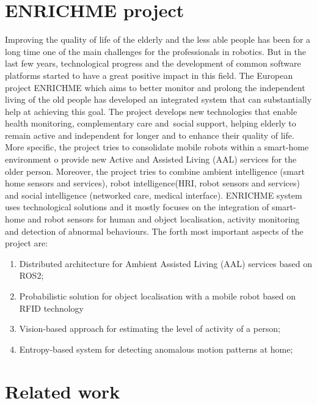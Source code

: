 \section{ENRICHME project}
Improving the quality of life of the elderly and the less able people has been for a long time one of the main challenges for
the professionals in robotics. But in the last few years, technological progress and the development of common software platforms
started to have a great positive impact in this field. The European project ENRICHME which aims to better monitor and prolong the
independent living of the old people has developed an integrated system that can substantially help at achieving this goal. 
The project develops new technologies that enable health monitoring, complementary care and social support, helping elderly to
remain active and independent for longer and to enhance their quality of life. More specific, the project tries to consolidate
mobile robots within a smart-home environment o provide new Active and Assisted Living (AAL) services for the older person.
Moreover, the project tries to combine ambient intelligence (smart home sensors and services), robot intelligence(HRI, robot sensors and services)
and social intelligence (networked care, medical interface). ENRICHME system uses technological solutions and it mostly focuses on the integration
of smart-home and robot sensors for human and object localisation, activity monitoring and detection of abnormal behaviours. The forth most important
aspects of the project are:
\begin{enumerate}
	\item Distributed architecture for Ambient Assisted Living (AAL)  services based on ROS2; 
	\item Probabilistic solution for object localisation with a mobile robot based on RFID technology 
	\item Vision-based approach for estimating the level of activity of a person;
	\item Entropy-based system for detecting anomalous motion patterns at home;
\end{enumerate}

\section{Related work }
